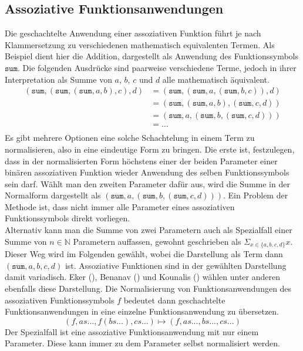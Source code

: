 \subsection {Assoziative Funktionsanwendungen}
Die geschachtelte Anwendung einer assoziativen Funktion führt je nach Klammersetzung zu verschiedenen mathematisch equivalenten Termen. Als Beispiel dient hier die Addition, dargestellt als Anwendung des Funktionssymbols $\texttt{sum}$. Die folgenden Ausdrücke sind paarweise verschiedene Terme, jedoch in ihrer Interpretation als Summe von $a$, $b$, $c$ und $d$ alle mathematisch äquivalent.
\begin{equation*}
	\begin{split}
	   (\texttt{sum}, (\texttt{sum}, (\texttt{sum}, a, b), c), d) 
    &= (\texttt{sum}, (\texttt{sum}, a, (\texttt{sum}, b, c)), d)\\
	&= (\texttt{sum}, (\texttt{sum}, a, b), (\texttt{sum}, c, d))\\
	&= (\texttt{sum}, a, (\texttt{sum}, b, (\texttt{sum}, c, d)))\\
	&= \dots \\
	\end{split}
\end{equation*}
Es gibt mehrere Optionen eine solche Schachtelung in einem Term zu normalisieren, also in eine eindeutige Form zu bringen. Die erste ist, festzulegen, dass in der normalisierten Form höchstens einer der beiden Parameter einer binären assoziativen Funktion wieder Anwendung des selben Funktionssymbols sein darf. Wählt man den zweiten Parameter dafür aus, wird die Summe in der Normalform dargestellt als $(\texttt{sum}, a, (\texttt{sum}, b, (\texttt{sum}, c, d)))$. Ein Problem der Methode ist, dass nicht immer alle Parameter eines assoziativen Funktionssymbols direkt vorliegen.\\
Alternativ kann man die Summe von zwei Parametern auch als Spezialfall einer Summe von $n \in \mathbb{N}$ Parametern auffassen, gewohnt geschrieben als $\Sigma_{x \in \{a, b, c, d\}} x$. Dieser Weg wird im Folgenden gewählt, wobei die Darstellung als Term dann $(\texttt{sum}, a, b, c, d)$ ist. Assoziative Funktionen sind in der gewählten Darstellung damit variadisch. Eker (\cite{BipartiteGraphMatching}), Benanav (\cite{NPHardMatching}) und Kounalis (\cite{ACPatternCompiler}) wählen unter anderen ebenfalls diese Darstellung. 
Die Normalisierung von Funktionsanwendungen des assoziativen Funktionssymbols $f$ bedeutet dann geschachtelte Funktionsanwendungen in eine einzelne Funktionsanwendung zu übersetzen. 
$$(f, as..., f(bs...), cs...) \mapsto (f, as..., bs..., cs...)$$
Der Spezialfall ist eine assoziative Funktionsanwendung mit nur einem Parameter. Diese kann immer zu dem Parameter selbst normalisiert werden. 

